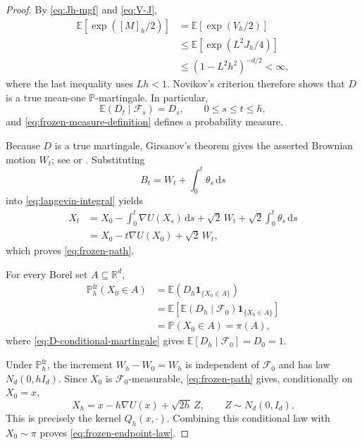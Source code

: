 \documentclass[11pt]{article}
\newcommand{\R}{\mathbb R}
\newcommand{\E}{\mathbb E}
\newcommand{\1}{\mathbf 1}
\newcommand{\df}{\mathrm{d}}
\begin{document}
	\begin{proof}
		By \eqref{eq:Jh-mgf} and \eqref{eq:V-J},
		\begin{align*}
			\E\left[\exp\left([M]_h/2\right)\right]
			&=\E\left[\exp\left(V_h/2\right)\right]\\
			&\leq\E\left[\exp\left(L^2J_h/4\right)\right]\\
			&\leq(1-L^2h^2)^{-d/2}<\infty,
		\end{align*}
		where the last inequality uses \(Lh<1\).  Novikov's criterion therefore
		shows that \(D\) is a true mean-one \(\mathbb P\)-martingale.  In
		particular,
		\begin{equation}\label{eq:D-conditional-martingale}
			\E(D_t\mid\mathcal F_s)=D_s,
			\qquad 0\leq s\leq t\leq h,
		\end{equation}
		and \eqref{eq:frozen-measure-definition} defines a probability measure.
		
		Because $D$ is a true martingale, Girsanov's theorem gives the asserted Brownian motion \(W_t\); see
		\citet[Section~3.5]{KaratzasShreve1991} or
		\citet[Chapter~VIII, Section~1]{RevuzYor1999}.  Substituting
		\[
		B_t=W_t+\int_0^t\theta_s\,\df s
		\]
		into \eqref{eq:langevin-integral} yields
		\begin{align*}
			X_t
			&=X_0-\int_0^t\nabla U(X_s)\,\df s
			+\sqrt{2}\,W_t
			+\sqrt{2}\int_0^t\theta_s\,\df s\\
			&=X_0-t\nabla U(X_0)+\sqrt{2}\,W_t,
		\end{align*}
		which proves \eqref{eq:frozen-path}.
		
		For every Borel set \(A\subseteq\R^d\),
		\begin{align*}
			\mathbb P_h^{\mathrm{fr}}(X_0\in A)
			&=\E\left(D_h\1_{\{X_0\in A\}}\right)\\
			&=\E\left[
			\E(D_h\mid\mathcal F_0)\1_{\{X_0\in A\}}
			\right]\\
			&=\mathbb P(X_0\in A)
			=\pi(A),
		\end{align*}
		where \eqref{eq:D-conditional-martingale} gives
		\(\E[D_h\mid\mathcal F_0]=D_0=1\).
		
		Under \(\mathbb P_h^{\mathrm{fr}}\), the increment \(W_h-W_0=W_h\) is
		independent of \(\mathcal F_0\) and has law \(N_d(0,hI_d)\).  Since \(X_0\)
		is \(\mathcal F_0\)-measurable, \eqref{eq:frozen-path} gives, conditionally
		on \(X_0=x\),
		\[
		X_h=x-h\nabla U(x)+\sqrt{2h}\,Z,
		\qquad Z\sim N_d(0,I_d).
		\]
		This is precisely the kernel \(Q_h(x,\cdot)\).  Combining this conditional
		law with \(X_0\sim\pi\) proves \eqref{eq:frozen-endpoint-law}.
	\end{proof}
	
\end{document}
